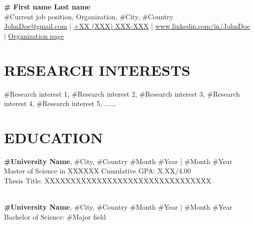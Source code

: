 \documentclass[a4paper,9pt]{extarticle}
\begin{document}
    \pagestyle{fancy}
    \renewcommand{\headrulewidth}{0pt}
    \fancyhead{}
    \thispagestyle{empty} %

    \begin{flushleft}
        \textbf{\LARGE \# First name Last name}\\[2pt] %
        \#Current job position, Organization, \#City, \#Country
        \\ \href{mailto:JohnDoe@gmail.com}{JohnDoe@gmail.com} | \href{tel:00XXXXXXXXX}{+XX (XXX) XXX-XXX} | \href{https://www.linkedin.com/in/JohnDoe}{www.linkedin.com/in/JohnDoe} | \href{https://JohnDoe/en/staff/single/59}{Organization page} %
    \end{flushleft}

    \section*{RESEARCH INTERESTS}
    \noindent
    \#Research interest 1, \#Research interest 2, \#Research interest 3, \#Research interest 4, \#Research interest 5, ......
    \section*{EDUCATION}
    \noindent
    \textbf{\#University Name}, \#City, \#Country \hfill \#Month \#Year | \#Month \#Year\\ %
    Master of Science in XXXXXX \hfill Cumulative GPA: X.XX/4.00 \\ %
    Thesis Title: XXXXXXXXXXXXXXXXXXXXXXXXXXXXXXXX%

    \noindent\\
    \textbf{\#University Name},  \#City, \#Country \hfill \#Month \#Year | \#Month \#Year\\ %
    Bachelor of Science: \#Major field  %

\end{document}
